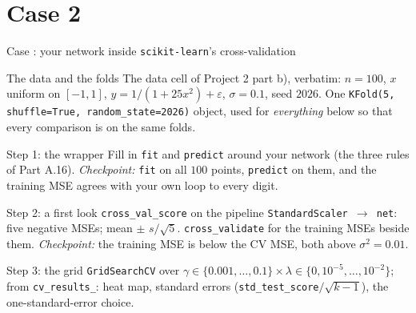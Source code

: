 \documentclass[10pt,aspectratio=169]{beamer}
\newcounter{case}
\newenvironment{case}[1][]{%
  \stepcounter{case}%
  \begin{frame}[fragile,environment=case]{Case \arabic{case}: #1}%
}{\end{frame}}
\begin{document}
\section{Case 2}
\begin{case}[your network inside \texttt{scikit-learn}'s cross-validation]
\small
\begin{block}{The data and the folds}
The data cell of Project 2 part b), verbatim: $n=100$, $x$ uniform on
$[-1,1]$, $y=1/(1+25x^{2})+\varepsilon$, $\sigma=0.1$, seed $2026$.  One
\texttt{KFold(5, shuffle=True, random\_state=2026)} object, used for
\emph{everything} below so that every comparison is on the same folds.
\end{block}
\begin{block}{Step 1: the wrapper}
Fill in \texttt{fit} and \texttt{predict} around your network (the three
rules of Part A.16).  \emph{Checkpoint:} \texttt{fit} on all $100$ points,
\texttt{predict} on them, and the training MSE agrees with your own loop to
every digit.
\end{block}
\begin{block}{Step 2: a first look}
\texttt{cross\_val\_score} on the pipeline \texttt{StandardScaler $\to$
net}: five negative MSEs; mean $\pm$ $s/\sqrt5$.
\texttt{cross\_validate} for the training MSEs beside them.
\emph{Checkpoint:} the training MSE is below the CV MSE, both above
$\sigma^{2}=0.01$.
\end{block}
\begin{block}{Step 3: the grid}
\texttt{GridSearchCV} over
$\gamma\in\{0.001,\dots,0.1\}\times\lambda\in\{0,10^{-5},\dots,10^{-2}\}$;
from \texttt{cv\_results\_}: heat map, standard errors
(\texttt{std\_test\_score}$/\sqrt{k-1}$), the one-standard-error choice.
\end{block}
\end{case}
\end{document}
